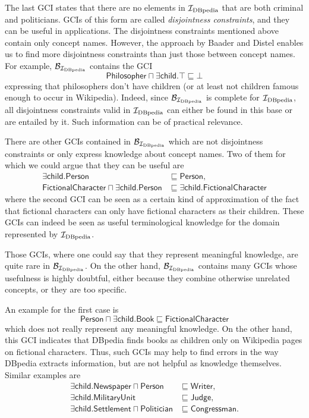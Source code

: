 The last GCI states that there are no elements in ${\mathcal{I}_{\text{DBpedia}}}$ that are both criminal and
politicians.  GCIs of this form are called \emph{disjointness constraints}, and they can
be useful in applications.  The disjointness constraints mentioned above contain only
concept names.  However, the approach by Baader and Distel enables us to find more
disjointness constraints than just those between concept names.  For example,
$\mathcal{B}_{{\mathcal{I}_{\text{DBpedia}}}}$ contains the GCI
\begin{equation*}
   \mathsf{Philosopher} \sqcap \exists \mathsf{child}. \top \sqsubseteq \bot
\end{equation*}
expressing that philosophers don't have children (or at least not children famous enough
to occur in Wikipedia).  Indeed, since $\mathcal{B}_{{\mathcal{I}_{\text{DBpedia}}}}$ is complete for
${\mathcal{I}_{\text{DBpedia}}}$, all disjointness constraints valid in ${\mathcal{I}_{\text{DBpedia}}}$ can either be found in this
base or are entailed by it.  Such information can be of practical relevance.

There are other GCIs contained in $\mathcal{B}_{\mathcal{I}_{\text{DBpedia}}}$ which are not disjointness
constraints or only express knowledge about concept names.  Two of them for which we could
argue that they can be useful are
\begin{align*}
  \mathsf{\exists child. Person} &\sqsubseteq \mathsf{Person}, \\
  \mathsf{FictionalCharacter \sqcap \exists child. Person} &\sqsubseteq \mathsf{\exists
    child. FictionalCharacter}
\end{align*}
where the second GCI can be seen as a certain kind of \ELbot approximation of the fact
that fictional characters can only have fictional characters as their children.  These
GCIs can indeed be seen as useful terminological knowledge for the domain represented by
${\mathcal{I}_{\text{DBpedia}}}$.

Those GCIs, where one could say that they represent meaningful knowledge, are quite rare
in $\mathcal{B}_{\mathcal{I}_{\text{DBpedia}}}$.  On the other hand, $\mathcal{B}_{\mathcal{I}_{\text{DBpedia}}}$ contains many GCIs
whose usefulness is highly doubtful, either because they combine otherwise unrelated
concepts, or they are too specific.

An example for the first case is
\begin{equation*}
  \mathsf{Person \sqcap \exists child. Book \sqsubseteq FictionalCharacter}
\end{equation*}
which does not really represent any meaningful knowledge.  On the other hand, this GCI
indicates that DBpedia finds books as children only on Wikipedia pages on fictional
characters.  Thus, such GCIs may help to find errors in the way DBpedia extracts
information, but are not helpful as knowledge themselves.  Similar examples are
\begin{align*}
  \mathsf{\exists child. Newspaper \sqcap Person} &\sqsubseteq \mathsf{Writer}, \\
  \mathsf{\exists child. MilitaryUnit} &\sqsubseteq \mathsf{Judge}, \\
  \mathsf{\exists child. Settlement \sqcap Politician} &\sqsubseteq \mathsf{Congressman}.
\end{align*}


